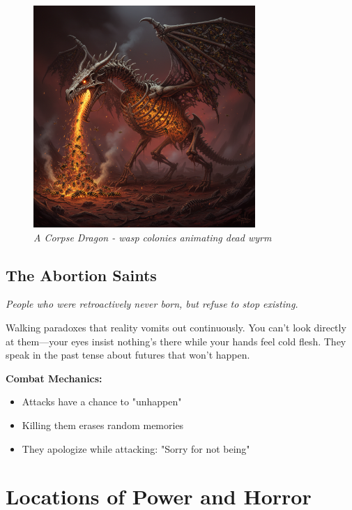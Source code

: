 \documentclass[11pt,a4paper,twoside]{book}
\begin{document}
\begin{figure}[h]
\centering
\includegraphics[width=0.75\textwidth]{images/corpse_dragon_2025-09-03T22-30-24-606Z_1.png}
\caption*{\textit{A Corpse Dragon - wasp colonies animating dead wyrm}}
\end{figure}

\section{The Abortion Saints}

\begin{adjustwidth}{1em}{1em}
\textit{People who were retroactively never born, but refuse to stop existing.}
\end{adjustwidth}

Walking paradoxes that reality vomits out continuously. You can't look directly at them—your eyes insist nothing's there while your hands feel cold flesh. They speak in the past tense about futures that won't happen.

\textbf{Combat Mechanics:}
\begin{itemize}
    \item Attacks have a chance to "unhappen"
    \item Killing them erases random memories
    \item They apologize while attacking: "Sorry for not being"
\end{itemize}

\chapter{Locations of Power and Horror}
\end{document}
